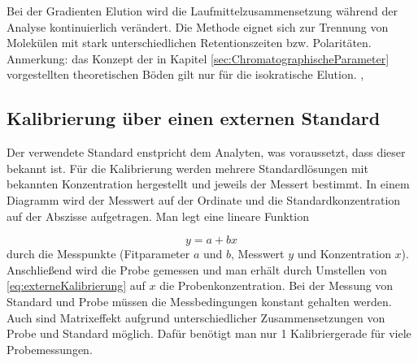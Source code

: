       Bei der Gradienten Elution wird die Laufmittelzusammensetzung während der Analyse kontinuierlich verändert. Die Methode eignet sich zur Trennung von Molekülen mit stark unterschiedlichen Retentionszeiten bzw. Polaritäten. Anmerkung: das Konzept der in Kapitel \ref{sec:ChromatographischeParameter} vorgestellten theoretischen Böden gilt nur für die isokratische Elution. \citep[S. 156]{Taschenatlas}, \citep{SkriptHPLC}
   
  \subsection{Kalibrierung über einen externen Standard}  
  
    Der verwendete Standard enstpricht dem Analyten, was voraussetzt, dass dieser bekannt ist. Für die Kalibrierung werden mehrere Standardlösungen mit bekannten Konzentration hergestellt und jeweils der Messert bestimmt. In einem Diagramm wird der Messwert auf der Ordinate und die Standardkonzentration auf der Abszisse aufgetragen. Man legt eine lineare Funktion 
    
      \begin{equation}
        y = a + b x \label{eq:externeKalibrierung}
      \end{equation}
    durch die Messpunkte (Fitparameter $a$ und $b$, Messwert $y$ und Konzentration $x$). Anschließend wird die Probe gemessen und man erhält durch Umstellen von \eqref{eq:externeKalibrierung} auf $x$ die Probenkonzentration. Bei der Messung von Standard und Probe müssen die Messbedingungen konstant gehalten werden. Auch sind Matrixeffekt aufgrund unterschiedlicher Zusammensetzungen von Probe und Standard möglich. Dafür benötigt man nur 1 Kalibriergerade für viele Probemessungen. 
  
      